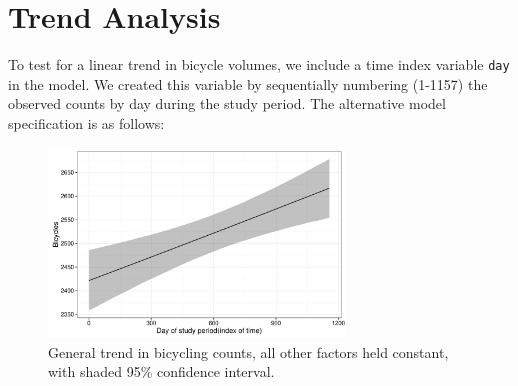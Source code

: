 \documentclass [11pt, proquest] {uwthesis}[2015/03/03]
\begin{document}

\section{Trend Analysis}
To test for a linear trend in bicycle volumes, we include a time index variable \texttt{day} in the model. We created this variable by sequentially numbering (1-1157) the observed counts by day during the study period. The alternative model specification is as follows:

\begin{figure}
\centering
   \includegraphics[width=0.7\textwidth]{figures/sim/trend} 
  \caption{General trend in bicycling counts, all other factors held constant, with shaded 95\% confidence interval.}
  \label{fig:trend}
\end{figure}
\end{document}
